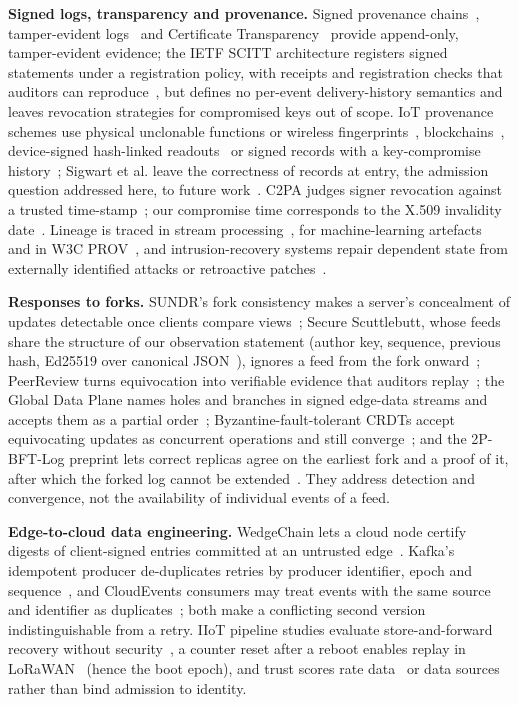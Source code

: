 \documentclass[futureinternet,article,submit,moreauthors]{Definitions/mdpi}
\begin{document}
\textbf{Signed logs, transparency and provenance.} Signed provenance chains~\cite{hasan2009tos}, tamper-evident logs~\cite{crosby2009tamper} and Certificate Transparency~\cite{rfc9162} provide append-only, tamper-evident evidence; the IETF SCITT architecture registers signed statements under a registration policy, with receipts and registration checks that auditors can reproduce~\cite{rfc9943}, but defines no per-event delivery-history semantics and leaves revocation strategies for compromised keys out of scope. IoT provenance schemes use physical unclonable functions or wireless fingerprints~\cite{aman2017provenance,aman2019provenance}, blockchains~\cite{javaid2018blockpro,sigwart2019bcprov}, device-signed hash-linked readouts~\cite{saito2025authenticity} or signed records with a key-compromise history~\cite{tsai2026actuation}; Sigwart et al. leave the correctness of records at entry, the admission question addressed here, to future work~\cite{sigwart2019bcprov}. C2PA judges signer revocation against a trusted time-stamp~\cite{c2pa25}; our compromise time corresponds to the X.509 invalidity date~\cite{rfc5280}. Lineage is traced in stream processing~\cite{palyvos2019genealog}, for machine-learning artefacts~\cite{sukumaran2026provenance} and in W3C PROV~\cite{w3c_prov_dm}, and intrusion-recovery systems repair dependent state from externally identified attacks or retroactive patches~\cite{goel2005taser,chandra2011warp}.

\textbf{Responses to forks.} SUNDR's fork consistency makes a server's concealment of updates detectable once clients compare views~\cite{li2004sundr}; Secure Scuttlebutt, whose feeds share the structure of our observation statement (author key, sequence, previous hash, Ed25519 over canonical JSON~\cite{ssb_protocol_guide}), ignores a feed from the fork onward~\cite{tarr2019ssb}; PeerReview turns equivocation into verifiable evidence that auditors replay~\cite{haeberlen2007peerreview}; the Global Data Plane names holes and branches in signed edge-data streams and accepts them as a partial order~\cite{mor2019gdp}; Byzantine-fault-tolerant CRDTs accept equivocating updates as concurrent operations and still converge~\cite{kleppmann2022bftcrdt}; and the 2P-BFT-Log preprint lets correct replicas agree on the earliest fork and a proof of it, after which the forked log cannot be extended~\cite{lavoie2023twopbftlog}. They address detection and convergence, not the availability of individual events of a feed.

\textbf{Edge-to-cloud data engineering.} WedgeChain lets a cloud node certify digests of client-signed entries committed at an untrusted edge~\cite{nawab2021wedgechain}. Kafka's idempotent producer de-duplicates retries by producer identifier, epoch and sequence~\cite{kip98}, and CloudEvents consumers may treat events with the same source and identifier as duplicates~\cite{cloudevents102}; both make a conflicting second version indistinguishable from a retry. IIoT pipeline studies evaluate store-and-forward recovery without security~\cite{matias2026resilient}, a counter reset after a reboot enables replay in LoRaWAN~\cite{yang2018lorawan} (hence the boot epoch), and trust scores rate data~\cite{lim2010trust} or data sources~\cite{gigli2025zonia} rather than bind admission to identity.
\end{document}

